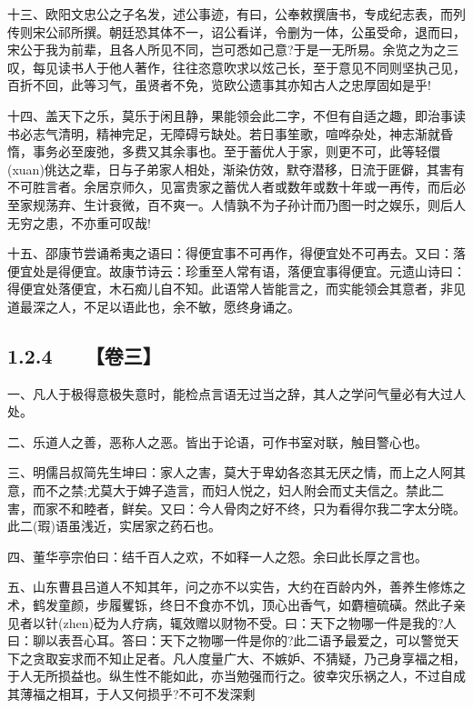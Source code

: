\documentclass[letterpaper,10pt,english]{sphinxmanual}
\begin{document}
十三、欧阳文忠公之子名发，述公事迹，有曰，公奉敕撰唐书，专成纪志表，而列传则宋公祁所撰。朝廷恐其体不一，诏公看详，令删为一体，公虽受命，退而曰，宋公于我为前辈，且各人所见不同，岂可悉如己意?于是一无所易。余览之为之三叹，每见读书人于他人著作，往往恣意吹求以炫己长，至于意见不同则坚执己见，百折不回，此等习气，虽贤者不免，览欧公遗事其亦知古人之忠厚固如是乎!

十四、盖天下之乐，莫乐于闲且静，果能领会此二字，不但有自适之趣，即治事读书必志气清明，精神完足，无障碍亏缺处。若日事笙歌，喧哗杂处，神志渐就昏惰，事务必至废弛，多费又其余事也。至于蓄优人于家，则更不可，此等轻儇(xuan)佻达之辈，日与子弟家人相处，渐染仿效，默夺潜移，日流于匪僻，其害有不可胜言者。余居京师久，见富贵家之蓄优人者或数年或数十年或一再传，而后必至家规荡弃、生计衰微，百不爽一。人情孰不为子孙计而乃图一时之娱乐，则后人无穷之患，不亦重可叹哉!

十五、邵康节尝诵希夷之语曰：得便宜事不可再作，得便宜处不可再去。又曰：落便宜处是得便宜。故康节诗云：珍重至人常有语，落便宜事得便宜。元遗山诗曰：得便宜处落便宜，木石痴儿自不知。此语常人皆能言之，而实能领会其意者，非见道最深之人，不足以语此也，余不敏，愿终身诵之。


\subsection{1.2.4   【卷三】}
\label{\detokenize{p00_u5176_u5b83/_u300a_u5f20_u82f1-_u806a_u8bad_u658b_u8bed_u300b_u300a_u5f20_u5ef7_u7389-_u6f84_u6000_u56ed_u8bed_u300b_u5408_u8f91:id11}}
一、凡人于极得意极失意时，能检点言语无过当之辞，其人之学问气量必有大过人处。

二、乐道人之善，恶称人之恶。皆出于论语，可作书室对联，触目警心也。

三、明儒吕叔简先生坤曰：家人之害，莫大于卑幼各恣其无厌之情，而上之人阿其意，而不之禁;尤莫大于婢子造言，而妇人悦之，妇人附会而丈夫信之。禁此二害，而家不和睦者，鲜矣。又曰：今人骨肉之好不终，只为看得尔我二字太分晓。此二(瑕)语虽浅近，实居家之药石也。

四、董华亭宗伯曰：结千百人之欢，不如释一人之怨。余曰此长厚之言也。

五、山东曹县吕道人不知其年，问之亦不以实告，大约在百龄内外，善养生修炼之术，鹤发童颜，步履矍铄，终日不食亦不饥，顶心出香气，如麝檀硫磺。然此子亲见者以针(zhen)砭为人疗病，辄效赠以财物不受。曰：天下之物哪一件是我的?人曰：聊以表吾心耳。答曰：天下之物哪一件是你的?此二语予最爱之，可以警觉天下之贪取妄求而不知止足者。凡人度量广大、不嫉妒、不猜疑，乃己身享福之相，于人无所损益也。纵生性不能如此，亦当勉强而行之。彼幸灾乐祸之人，不过自成其薄福之相耳，于人又何损乎?不可不发深剩
\end{document}
